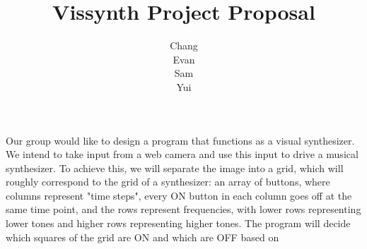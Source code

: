 \documentclass{article}
\title{Vissynth Project Proposal}
\author{Chang \\ Evan \\ Sam \\ Yui}
\begin{document}
\maketitle

Our group would like to design a program that functions as a visual synthesizer. We
intend to take input from a web camera and use this input to drive a musical
synthesizer. To achieve this, we will separate the image into a grid, which will
roughly correspond to the grid of a synthesizer: an array of buttons, where columns
represent "time steps", every ON button in each column goes off at the same time
point, and the rows represent frequencies, with lower rows representing lower tones
and higher rows representing higher tones. The program will decide which squares of the grid are ON and which are OFF based on 
\end{document}
